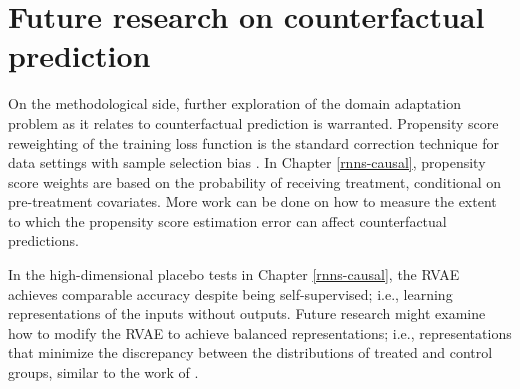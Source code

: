 \section{Future research on counterfactual prediction}

On the methodological side, further exploration of the domain adaptation problem as it relates to counterfactual prediction is warranted. Propensity score reweighting of the training loss function is the standard correction technique for data settings with sample selection bias \citep{cortes2008sample}. In Chapter \ref{rnns-causal}, propensity score weights are based on the probability of receiving treatment, conditional on pre-treatment covariates. More work can be done on how to measure the extent to which the propensity score estimation error can affect counterfactual predictions. 

In the high-dimensional placebo tests in Chapter \ref{rnns-causal}, the RVAE achieves comparable accuracy despite being self-supervised; i.e., learning representations of the inputs without outputs. Future research might examine how to modify the RVAE to achieve balanced representations; i.e., representations that minimize the discrepancy between the distributions of treated and control groups, similar to the work of \citet{johansson2016learning}.


